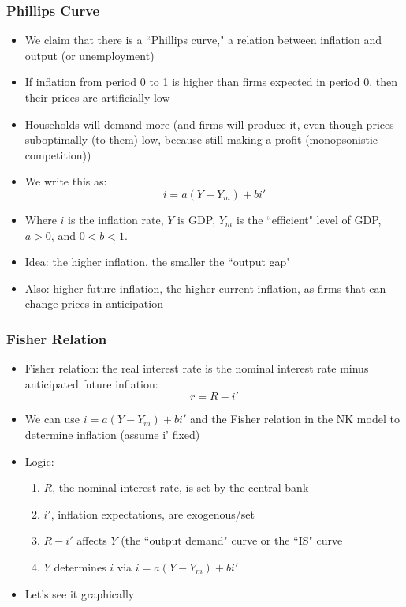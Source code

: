 \documentclass{beamer}
\begin{document}
\begin{frame}
\frametitle[alignment=center]{Phillips Curve}
\begin{itemize}
\item We claim that there is a ``Phillips curve," a relation between inflation and output (or unemployment)
\bigskip
\item If inflation from period 0 to 1 is higher than firms expected in period 0, then their prices are artificially low
\bigskip
\item Households will demand more (and firms will produce it, even though prices suboptimally (to them) low, because still making a profit (monopsonistic competition))
\bigskip
\item We write this as:
$$i=a(Y-Y_m)+bi'$$
\item Where $i$ is the inflation rate, $Y$ is GDP, $Y_m$ is the ``efficient" level of GDP, $a>0$, and $0<b<1$.  
\bigskip
\item Idea: the higher inflation, the smaller the ``output gap"
\item Also: higher future inflation, the higher current inflation, as firms that can change prices in anticipation 
\end{itemize}
\end{frame}



\begin{frame}
\frametitle[alignment=center]{Fisher Relation}
\begin{itemize}
\item Fisher relation: the real interest rate is the nominal interest rate minus anticipated future inflation:
$$r=R-i'$$
\item We can use $i=a(Y-Y_m)+bi'$ and the Fisher relation in the NK model to determine inflation (assume i' fixed)
\bigskip
\item Logic:
\begin{enumerate}
\item $R$, the nominal interest rate, is set by the central bank
\item $i'$, inflation expectations, are exogenous/set
\item $R-i'$ affects $Y$ (the ``output demand" curve or the ``IS" curve 
\item $Y$ determines $i$ via $i=a(Y-Y_m)+bi'$
\end{enumerate}
\item Let's see it graphically
\end{itemize}
\end{frame}
\end{document}
